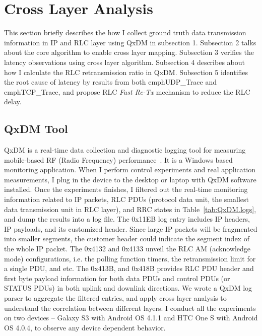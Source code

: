 \section{Cross Layer Analysis}

This section briefly describes the how I collect ground truth data transmission information in IP and RLC layer using QxDM in subsection 1. Subsection 2 talks about the core algorithm to enable cross layer mapping. Subsection 3 verifies the latency observations using cross layer algorithm. Subsection 4 describes about how I calculate the RLC retransmission ratio in QxDM. Subsection 5 identifies the root cause of latency by results from both emph{UDP\_{}Trace} and emph{TCP\_{}Trace}, and propose RLC \textit{Fast Re-Tx} mechanism to reduce the RLC delay.

\subsection{QxDM Tool}

QxDM is a real-time data collection and diagnostic logging tool for measuring mobile-based RF (Radio Frequency) performance~\cite{qxdm_flyer}. It is a Windows based monitoring application. When I perform control experiments and real application measurements, I plug in the device to the desktop or laptop with QxDM software installed. Once the experiments finishes, I filtered out the real-time monitoring information related to IP packets, RLC PDUs (protocol data unit, the smallest data transmission unit in RLC layer), and RRC states in Table~\ref{tab:QxDM.logs}, and dump the results into a log file. The 0x11EB log entry includes IP headers, IP payloads, and its customized header. Since large IP packets will be fragmented into smaller segments, the customer header could indicate the segment index of the whole IP packet. The 0x4132 and 0x4133 unveil the RLC AM (acknowledge mode) configurations, i.e. the polling function timers, the retransmission limit for a single PDU, and etc. The 0x413B, and 0x418B provides RLC PDU header and first byte payload information for both data PDUs and control PDUs (or STATUS PDUs) in both uplink and downlink directions. We wrote a QxDM log parser to aggregate the filtered entries, and apply cross layer analysis to understand the correlation between different layers. I conduct all the experiments on two devices -- Galaxy S3 with Android OS 4.1.1 and HTC One S with Android OS 4.0.4, to observe any device dependent behavior.

